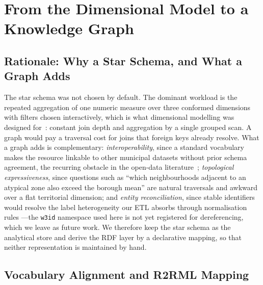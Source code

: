 \documentclass[runningheads]{llncs}
\newif\ifmarcarcambios
\newcommand{\icokg}[1]{\ifmarcarcambios\textcolor{nuevo}{#1}\else#1\fi}
\newenvironment{icokgblock}{\ifmarcarcambios\color{nuevo}\fi}{}
\renewcommand{\_}{\origunderscore\allowbreak}
\begin{document}
\begin{icokgblock}
\section{From the Dimensional Model to a Knowledge Graph}
\label{sec:kg}

\subsection{Rationale: Why a Star Schema, and What a Graph Adds}

The star schema was not chosen by default. The dominant workload is the repeated
aggregation of one numeric measure over three conformed dimensions with filters
chosen interactively, which is what dimensional modelling was designed
for~\cite{kimball}: constant join depth and aggregation by a single grouped scan.
A graph would pay a traversal cost for joins that foreign keys already resolve.
What a graph adds is complementary: \emph{interoperability}, since a standard
vocabulary makes the resource linkable to other municipal datasets without prior schema
agreement, the recurring obstacle in the open-data literature~\cite{vetro2016}; \emph{topological expressiveness}, since
questions such as ``which neighbourhoods adjacent to an atypical zone also exceed
the borough mean'' are natural traversals and awkward over a flat territorial
dimension; and \emph{entity reconciliation}, since \icokg{stable identifiers would resolve
the label heterogeneity our ETL absorbs through normalisation rules ---the
\texttt{w3id} namespace used here is not yet registered for dereferencing, which
we leave as future work}. We
therefore keep the star schema as the analytical store and derive the RDF layer
by a declarative mapping, so that neither representation is maintained by hand.

\subsection{Vocabulary Alignment and R2RML Mapping}


\end{icokgblock}
\end{document}
